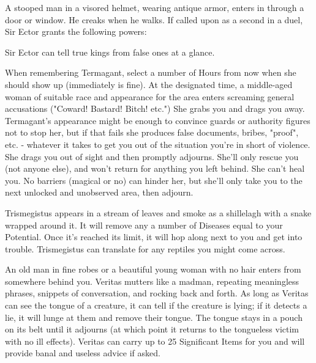 {

A stooped man in a visored helmet, wearing antique armor, enters in through a door or window.  He creaks when he walks.  If called upon as a second in a duel, Sir Ector grants the following powers:


Sir Ector can tell true kings from false ones at a glance.



When remembering Termagant, select a number of Hours from now when she should show up (immediately is fine).  At the designated time, a middle-aged woman of suitable race and appearance for the area enters screaming general accusations ("Coward!  Bastard!  Bitch!  etc.")  She grabs you and drags you away.  Termagant's appearance might be enough to convince guards or authority figures not to stop her, but if that fails she produces false documents, bribes, "proof", etc. - whatever it takes to get you out of the situation you're in short of violence.  She drags you out of sight and then promptly adjourns.  She'll only rescue you (not anyone else), and won't return for anything you left behind.  She can't heal you.  No barriers (magical or no) can hinder her, but she'll only take you to the next unlocked and unobserved area, then adjourn.


Trismegistus appears in a stream of leaves and smoke as a shillelagh with a snake wrapped around it.  It will remove any a number of Diseases equal to your Potential.  Once it's reached its limit, it will hop along next to you and get into trouble.  Trismegistus can translate for any reptiles you might come across.


An old man in fine robes or a beautiful young woman with no hair enters from somewhere behind you.  Veritas mutters like a madman, repeating meaningless phrases, snippets of conversation, and rocking back and forth.  As long as Veritas can see the tongue of a creature, it can tell if the creature is lying; if it detects a lie, it will lunge at them and remove their tongue.  The tongue stays in a pouch on its belt until it adjourns (at which point it returns to the tongueless victim with no ill effects).  Veritas can carry up to 25 Significant Items for you and will provide banal and useless advice if asked.


}
